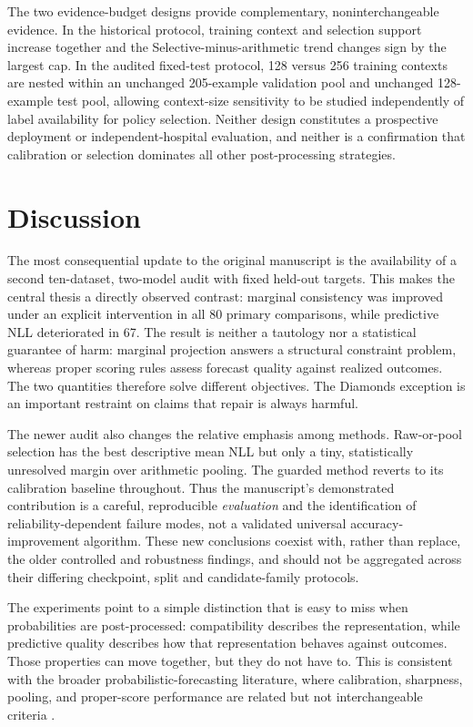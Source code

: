 \documentclass[a4paper,fleqn]{cas-sc}
\begin{document}
The two evidence-budget designs provide complementary, noninterchangeable evidence. In the historical protocol, training context and selection support increase together and the Selective-minus-arithmetic trend changes sign by the largest cap. In the audited fixed-test protocol, 128 versus 256 training contexts are nested within an unchanged 205-example validation pool and unchanged 128-example test pool, allowing context-size sensitivity to be studied independently of label availability for policy selection. Neither design constitutes a prospective deployment or independent-hospital evaluation, and neither is a confirmation that calibration or selection dominates all other post-processing strategies.

\clearpage
\section{Discussion}
The most consequential update to the original manuscript is the availability of a second ten-dataset, two-model audit with fixed held-out targets. This makes the central thesis a directly observed contrast: marginal consistency was improved under an explicit intervention in all 80 primary comparisons, while predictive NLL deteriorated in 67. The result is neither a tautology nor a statistical guarantee of harm: marginal projection answers a structural constraint problem, whereas proper scoring rules assess forecast quality against realized outcomes. The two quantities therefore solve different objectives. The Diamonds exception is an important restraint on claims that repair is always harmful.

The newer audit also changes the relative emphasis among methods. Raw-or-pool selection has the best descriptive mean NLL but only a tiny, statistically unresolved margin over arithmetic pooling. The guarded method reverts to its calibration baseline throughout. Thus the manuscript's demonstrated contribution is a careful, reproducible \emph{evaluation} and the identification of reliability-dependent failure modes, not a validated universal accuracy-improvement algorithm. These new conclusions coexist with, rather than replace, the older controlled and robustness findings, and should not be aggregated across their differing checkpoint, split and candidate-family protocols.

The experiments point to a simple distinction that is easy to miss when probabilities are post-processed: compatibility describes the representation, while predictive quality describes how that representation behaves against outcomes. Those properties can move together, but they do not have to. This is consistent with the broader probabilistic-forecasting literature, where calibration, sharpness, pooling, and proper-score performance are related but not interchangeable criteria \citep{gneiting2007calibration,ranjan2010combining,gneiting2013combining}.
\end{document}
